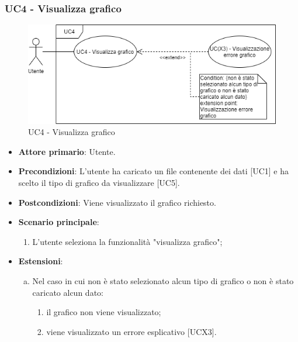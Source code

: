 \subsubsection{UC4 - Visualizza grafico}
\begin{figure}[h]
\includegraphics[width=\linewidth]{section/Images/UC4VisualizzaGrafico.png}
\centering
\caption{UC4 - Visualizza grafico}
\end{figure}
\begin{itemize}
	\item \textbf{Attore primario}: Utente.
	\item \textbf{Precondizioni}: L'utente ha caricato un file contenente dei dati [UC1] e ha scelto il tipo di grafico da visualizzare [UC5].
	\item \textbf{Postcondizioni}: Viene visualizzato il grafico richiesto.
	\item \textbf{Scenario principale}:
		\begin{enumerate}
			\item L'utente seleziona la funzionalità "visualizza grafico";
		\end{enumerate}
	\item \textbf{Estensioni}:
	\begin{enumerate}[(a)]
		\item Nel caso in cui non è stato selezionato alcun tipo di grafico o non è stato caricato alcun dato:
		\begin{enumerate}[1.]
			\item il grafico non viene visualizzato;
			\item viene visualizzato un errore esplicativo [UCX3].
		\end{enumerate}
	\end{enumerate}
\end{itemize}